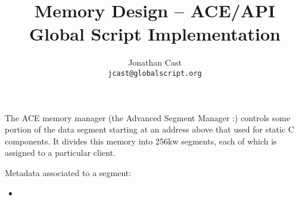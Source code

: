 \documentclass{article}
\title{Memory Design -- ACE/API Global Script Implementation}
\author{Jonathan Cast\\\texttt{jcast@globalscript.org}}
\begin{document}
\maketitle

The ACE memory manager (the Advanced Segment Manager :) controls some portion of the data segment starting at an address above that used for static C components.
It divides this memory into 256kw segments, each of which is assigned to a particular client.

Metadata associated to a segment:

\begin{itemize}
    \item 
\end{itemize}
\end{document}
